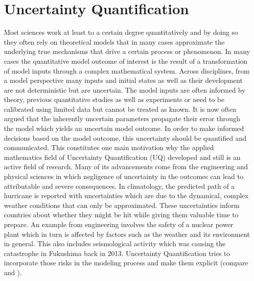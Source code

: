 \section{Uncertainty Quantification} \label{uq}
\thispagestyle{plain} %

Most sciences work at least to a certain degree quantitatively and by doing so they often rely on theoretical models that in many cases approximate the underlying true mechanisms that drive a certain process or phenomenon. In many cases the quantitative model outcome of interest is the result of a transformation of model inputs through a complex mathematical system. Across disciplines, from a model perspective many inputs and initial states as well as their development are not deterministic but are uncertain. The model inputs are often informed by theory, previous quantitative studies as well as experiments or need to be calibrated using limited data but cannot be treated as known. It is now often argued that the inherently uncertain parameters propagate their error through the model which yields an uncertain model outcome. In order to make informed decisions based on the model outcome, this uncertainty should be quantified and communicated. This constitutes one main motivation why the applied mathematics field of Uncertainty Quantification (UQ) developed and still is an active field of research. Many of its advancements come from the engineering and physical sciences in which negligence of uncertainty in the outcomes can lead to attributable and severe consequences. In climatology, the predicted path of a hurricane is reported with uncertainties which are due to the dynamical, complex weather conditions that can only be approximated. These uncertainties inform countries about whether they might be hit while giving them valuable time to prepare. An example from engineering involves the safety of a nuclear power plant which in turn is affected by factors such as the weather and its environment in general. This also includes seismological activity which was causing the catastrophe in Fukushima back in 2013. Uncertainty Quantification tries to incorporate those risks in the modeling process and make them explicit (compare \cite{Sullivan.2015} and \cite{Smith.2013}).


